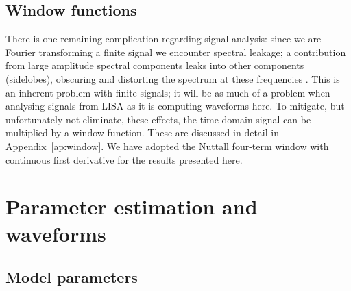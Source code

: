 \documentclass[useAMS,usedcolumn,usegraphicx,usenatbib]{mn2e}
\newcommand{\apref}[1]{Appendix~\ref{ap:#1}}
\begin{document}
\subsection{Window functions}

There is one remaining complication regarding signal analysis: since we are Fourier transforming a finite signal we encounter spectral leakage; a contribution from large amplitude spectral components leaks into other components (sidelobes), obscuring and distorting the spectrum at these frequencies \citep{Harris1978}. This is an inherent problem with finite signals; it will be as much of a problem when analysing signals from LISA as it is computing waveforms here. To mitigate, but unfortunately not eliminate, these effects, the time-domain signal can be multiplied by a window function. These are discussed in detail in \apref{window}. We have adopted the Nuttall four-term window with continuous first derivative \citep{Nuttall1981} for the results presented here.

\section{Parameter estimation and waveforms}

\subsection{Model parameters}\label{sec:Parameters}
\end{document}
